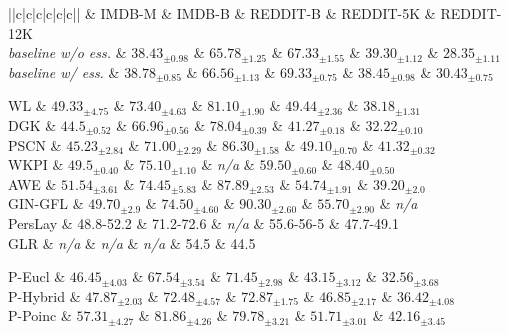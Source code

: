 \begin{code}
    \begin{itabular}{||c|c|c|c|c|c||}
        \hline
               & IMDB-M & IMDB-B & REDDIT-B & REDDIT-5K &  REDDIT-12K \\ \hline\hline
           \textit{baseline w/o ess.} & $38.43_{\pm 0.98}$ & $65.78_{\pm 1.25}$ & $67.33_{\pm 1.55}$ & $39.30_{\pm 1.12}$ & $28.35_{\pm 1.11}$\\ 
           \textit{baseline w/ ess.} & $38.78_{\pm 0.85}$ & $66.56_{\pm 1.13}$ & $69.33_{\pm 0.75}$ & $38.45_{\pm 0.98}$ & $30.43_{\pm 0.75}$\\ \hline\hline
    
            WL & $49.33_{\pm 4.75}$ & $73.40_{\pm 4.63}$ & $81.10_{\pm 1.90}$ & $49.44_{\pm 2.36}$ & $38.18_{\pm 1.31}$ \\
           DGK & $44.5_{\pm 0.52}$ & $66.96_{\pm 0.56}$ & $78.04_{\pm 0.39}$ & $41.27_{\pm 0.18}$ & $32.22_{\pm 0.10}$\\
          PSCN & $45.23_{\pm 2.84}$ & $71.00_{\pm 2.29}$ & $86.30_{\pm 1.58}$ & $49.10_{\pm 0.70}$ & $41.32_{\pm 0.32}$\\
          WKPI & $49.5_{\pm 0.40}$ & $75.10_{\pm 1.10}$ & \textit{n/a} & $59.50_{\pm 0.60}$ & $48.40_{\pm 0.50}$\\
           AWE & $51.54_{\pm 3.61}$ & $74.45_{\pm 5.83}$ & $87.89_{\pm 2.53}$ & $54.74_{\pm 1.91}$ & $39.20_{\pm 2.0}$\\ 
        GIN-GFL & $49.70_{\pm 2.9}$ & $74.50_{\pm 4.60}$ & $90.30_{\pm 2.60}$ & $55.70_{\pm 2.90}$ & \textit{n/a}\\ 
    
           PersLay & 48.8-52.2 & 71.2-72.6 & \textit{n/a} & 55.6-56-5 & 47.7-49.1\\ 
           GLR & \textit{n/a} & \textit{n/a} & \textit{n/a} & 54.5 & 44.5 \\ \hline\hline
    
    
           P-Eucl &  $46.45_{\pm 4.03}$ & $67.54_{\pm 3.54}$ & $71.45_{\pm 2.98}$ & $43.15_{\pm 3.12}$ & $32.56_{\pm 3.68}$\\
           P-Hybrid &  $47.87_{\pm 2.03}$ & $72.48_{\pm 4.57}$ & $72.87_{\pm 1.75}$ & $46.85_{\pm 2.17}$ & $36.42_{\pm 4.08}$\\
    
           P-Poinc &  $57.31_{\pm 4.27}$ & $81.86_{\pm 4.26}$ & $79.78_{\pm 3.21}$ & $51.71_{\pm  3.01}$ & $42.16_{\pm 3.45}$ \\ \hline
    \end{itabular}
\end{code}

